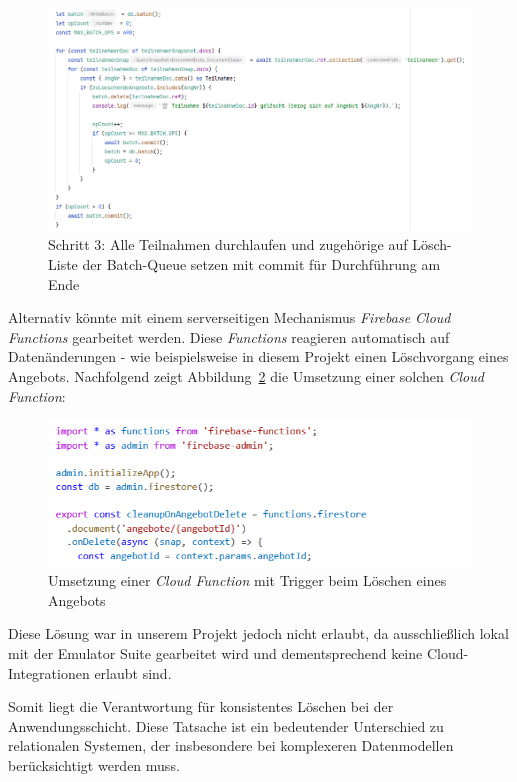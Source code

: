 \documentclass[12pt,a4paper%
              ,oneside     %
              ,titlepage
              ,DIV=13
              ,headinclude
              ,footinclude=false%
              ,cleardoublepage=empty%
              ,parskip=half,
              BCOR=0mm,
              ]{scrreprt}
\begin{document}
\begin{figure}[H]
	\centering
	\includegraphics[width=\linewidth]{img/transaction_3.png}
	\caption{Schritt 3: Alle Teilnahmen durchlaufen und zugehörige auf Lösch-Liste der Batch-Queue setzen mit commit für Durchführung am Ende}
	\label{fig:transaction-3}
\end{figure}

Alternativ könnte mit einem serverseitigen Mechanismus \textit{Firebase Cloud Functions} \cite{Firebase.CloudFunctions} gearbeitet werden. Diese \textit{Functions} reagieren automatisch auf Datenänderungen - wie beispielsweise in diesem Projekt einen Löschvorgang eines Angebots. Nachfolgend zeigt Abbildung~\ref{fig:cloud-function} die Umsetzung einer solchen \textit{Cloud Function}:

\begin{figure}[H]
	\centering
	\includegraphics[width=\dimexpr0.8\linewidth]{img/cloud_function.png}
	\caption{Umsetzung einer \textit{Cloud Function} mit Trigger beim Löschen eines Angebots}
	\label{fig:cloud-function}
\end{figure}

Diese Lösung war in unserem Projekt jedoch nicht erlaubt, da ausschließlich lokal mit der Emulator Suite gearbeitet wird und dementsprechend keine Cloud-Integrationen erlaubt sind.

Somit liegt die Verantwortung für konsistentes Löschen bei der Anwendungsschicht. Diese Tatsache ist ein bedeutender Unterschied zu relationalen Systemen, der insbesondere bei komplexeren Datenmodellen berücksichtigt werden muss.
\end{document}
